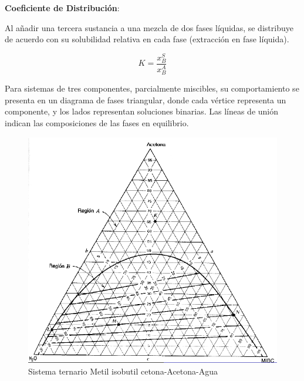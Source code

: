             \textbf{Coeficiente de Distribución}:
            
            Al añadir una tercera sustancia a una mezcla de dos fases líquidas, se distribuye de acuerdo con su solubilidad relativa en cada fase (extracción en fase líquida).
            
            \begin{quote}
                \textit{}
            \end{quote}
            
            \begin{equation}
            \label{eq:coef_distribucion}
                K = \frac{x_{B}^{S}}{x_{B}^{A}}
            \end{equation}
            
            
            Para sistemas de tres componentes, parcialmente miscibles, su comportamiento se presenta en un diagrama de fases triangular, donde cada vértice representa un componente, y los lados representan soluciones binarias. Las líneas de unión indican las composiciones de las fases en equilibrio.
            
            \begin{figure}
                \centering
                \includegraphics[width=\textwidth]{img/diagramas/sistema_ternario.png}
                \caption{Sistema ternario Metil isobutil cetona-Acetona-Agua}
                \label{fig:sistema_ternario}
            \end{figure}
        
